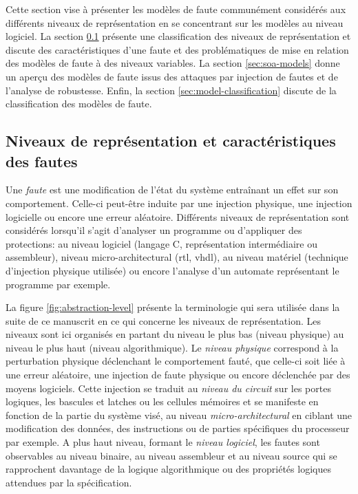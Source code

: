         Cette section vise à présenter les modèles de faute communément considérés aux différents niveaux de représentation en se concentrant sur les modèles au niveau logiciel.
        La section \ref{sec:abstraction-level-fault} présente une classification des niveaux de représentation et discute des caractéristiques d'une faute et des problématiques de mise en relation des modèles de faute à des niveaux variables.
        La section \ref{sec:soa-models} donne un aperçu des modèles de faute issus des attaques par injection de fautes et de l'analyse de robustesse.
        Enfin, la section \ref{sec:model-classification} discute de la classification des modèles de faute. 
        
        \subsection{Niveaux de représentation et caractéristiques des fautes}
        \label{sec:abstraction-level-fault}
        
            Une \textit{faute} est une modification de l'état du système entraînant un effet sur son comportement. Celle-ci peut-être induite par une injection physique, une injection logicielle ou encore une erreur aléatoire.
            Différents niveaux de représentation sont considérés lorsqu'il s'agit d'analyser un programme ou d'appliquer des protections: au niveau logiciel (langage C, représentation intermédiaire ou assembleur), niveau micro-architectural (\gls{rtl}, \gls{vhdl}), au niveau matériel (technique d'injection physique utilisée) ou encore l'analyse d'un automate représentant le programme par exemple.
            
            La figure \ref{fig:abstraction-level} présente la terminologie qui sera utilisée dans la suite de ce manuscrit en ce qui concerne les niveaux de représentation.
            Les niveaux sont ici organisés en partant du niveau le plus bas (niveau physique) au niveau le plus haut (niveau algorithmique).
            Le \textit{niveau physique} correspond à la perturbation physique déclenchant le comportement fauté, que celle-ci soit liée à une erreur aléatoire, une injection de faute physique ou encore déclenchée par des moyens logiciels.
            Cette injection se traduit au \textit{niveau du circuit} sur les portes logiques, les bascules et latches ou les cellules mémoires et se manifeste en fonction de la partie du système visé, au niveau \textit{micro-architectural} en ciblant une modification des données, des instructions ou de parties spécifiques du processeur par exemple.
            A plus haut niveau, formant le \textit{niveau logiciel}, les fautes sont observables au niveau binaire, au niveau assembleur et au niveau source qui se rapprochent davantage de la logique algorithmique ou des propriétés logiques attendues par la spécification.
            

